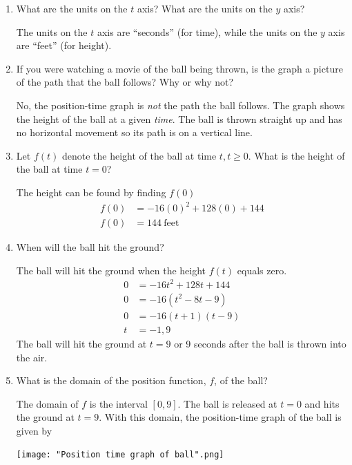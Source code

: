\documentclass[nooutcomes,handout]{ximera}
\begin{document}
\begin{problem}
\begin{enumerate}
		 \item  What are the units on the $t$ axis?  What are the units on the $y$ axis?
		 \begin{freeResponse}		 
	The units on the $t$ axis are ``seconds'' (for time), while the units on the $y$ axis are ``feet'' (for height).        
		\end{freeResponse}
			
		\item  If you were watching a movie of the ball being thrown, is the graph a picture of the path that the ball follows?  Why or why not?
		\begin{freeResponse}		 
	 No, the position-time graph is \emph{not} the path the ball follows.
        The graph shows the height of the ball at a given \emph{time}.
        The ball is thrown straight up and has no horizontal movement so its path is on a vertical line.
		\end{freeResponse}
	
		\item Let $f(t)$ denote the height of the ball at time $t, t\geq 0$.  What is the height of the ball at time $t=0$?
		\begin{freeResponse}
		The height can be found by finding $f(0)$
		\begin{align*}
			f(0)&=-16(0)^2+128(0)+144 \\
			f(0)&=144\  \text{feet}
 			\end{align*}

		\end{freeResponse}
		
		\item  When will the ball hit the ground?
		\begin{freeResponse}		 
		The ball will hit the ground when the height $f(t)$ equals zero.
			\begin{align*}
			0&=-16t^2+128t+144 \\
			0&=-16(t^2-8t-9) \\
 			0&=-16(t+1)(t-9) \\
 			t&=-1,9 
 			\end{align*}
		The ball will hit the ground at $t=9$ or 9 seconds after the ball is thrown into the air.  
		\end{freeResponse}

		\item  What is the domain of the position function, $f$, of the ball?

		 \begin{freeResponse}
     	   The domain of $f$ is the interval $[0, 9]$.  The ball is released at $t=0$ and hits the ground at $t=9$.
     	   With this domain, the position-time graph of the ball is given by
       		 \begin{center}
       	  	 \texttt{[image: "Position time graph of ball".png]}
        		\end{center}
     	 \end{freeResponse}


\end{enumerate}
\end{problem}
\end{document}
